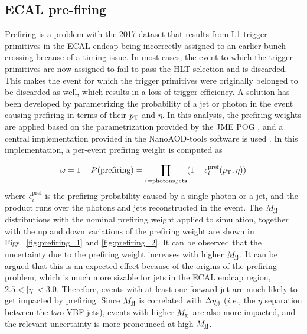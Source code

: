 \clearpage

\subsection{ECAL pre-firing}
\label{subsec:prefiring_weighting}

Prefiring is a problem with the 2017 dataset that results from L1 trigger primitives
in the ECAL endcap being incorrectly assigned to an earlier bunch crossing because
of a timing issue. In most cases, the event to which the trigger primitives are now assigned to
fail to pass the HLT selection and is discarded. This makes the event for which the trigger
primitives were originally belonged to be discarded as well, which results in a loss of trigger
efficiency. A solution has been developed by parametrizing
the probability of a jet or photon in the event causing prefiring in terms of their
$p_{\textrm{T}}$ and $\eta$. In this analysis, the prefiring weights are applied based on the parametrization
provided by the JME POG \cite{CMS:PrefiringTwiki}, and a central implementation provided in the
NanoAOD-tools software is used \cite{CMS:PrefiringNanoAODTools}. In this implementation, a per-event
prefiring weight is computed as

\begin{equation}
    \omega = 1 - P(\textrm{prefiring}) = \prod_{i=\textrm{photons,jets}} (1 - \epsilon_{i}^{\textrm{pref}}(p_{\textrm{T}}, \eta))
\end{equation}
where $\epsilon_{i}^{\textrm{pref}}$ is the prefiring probability caused by a single photon or a jet, and the product
runs over the photons and jets reconstructed in the event.
The $M_{\textrm{jj}}$ distributions with the nominal prefiring weight applied to simulation, together with the
up and down variations of the prefiring weight are shown in Figs.~\ref{fig:prefiring_1} and \ref{fig:prefiring_2}.
It can be observed that the uncertainty due to the prefiring weight increases with higher $M_{\textrm{jj}}$. It can be argued
that this is an expected effect because of the origins of the prefiring problem, which is much more sizable for jets
in the ECAL endcap region, $2.5 < |\eta| < 3.0$. Therefore, events with at least one forward jet are much likely to
get impacted by prefiring. Since $M_{\textrm{jj}}$ is correlated with $\Delta \eta_{\textrm{jj}}$ (\textit{i.e.,} the $\eta$ separation between the two
VBF jets), events with higher $M_{\textrm{jj}}$ are also more impacted, and the relevant uncertainty is more pronounced
at high $M_{\textrm{jj}}$. 

